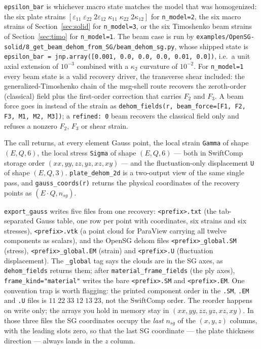 \texttt{epsilon\_bar} is whichever macro state matches the model that was
homogenized: the six plate strains
$[\varepsilon_{11}\;\varepsilon_{22}\;2\varepsilon_{12}\;\kappa_{11}\;
\kappa_{22}\;2\kappa_{12}]$ for \texttt{n\_model=2}, the six macro strains of
Section~\ref{sec:solid} for \texttt{n\_model=3}, or the six Timoshenko beam
strains of Section~\ref{sec:timo} for \texttt{n\_model=1}. The beam case is run by
\texttt{examples/OpenSG-solid/8\_get\_beam\_dehom\_from\_SG/beam\_dehom\_sg.py},
whose shipped state is
\verb|epsilon_bar = jnp.array([0.001, 0.0, 0.0, 0.0, 0.01, 0.0])|, i.e.\ a unit
axial extension of $10^{-3}$ combined with a $\kappa_2$ curvature of $10^{-2}$.
For \texttt{n\_model=1} every beam state is a valid recovery driver, the
transverse shear included: the generalized-Timoshenko chain of the msg-shell
route recovers the zeroth-order (classical) field plus the first-order
correction that carries $F_2$ and $F_3$. A beam force goes in instead of the
strain as \texttt{dehom\_fields(r, beam\_force=[F1, F2, F3, M1, M2, M3])}; a
\texttt{refined: 0} beam recovers the classical field only and refuses a
nonzero $F_2$, $F_3$ or shear strain.

The call returns, at every element Gauss point, the local strain \texttt{Gamma}
of shape $(E, Q, 6)$, the local stress \texttt{Sigma} of shape $(E, Q, 6)$ ---
both in SwiftComp storage order $(xx, yy, zz, yz, xz, xy)$ --- and the
fluctuation-only displacement \texttt{U} of shape $(E, Q, 3)$.
\texttt{plate\_dehom\_2d} is a two-output view of the same single pass, and
\texttt{gauss\_coords(r)} returns the physical coordinates of the recovery
points as $(E \cdot Q, n_{sg})$.

\texttt{export\_gauss} writes five files from one recovery:
\texttt{<prefix>.txt} (the tab-separated Gauss table, one row per point with
coordinates, six strains and six stresses), \texttt{<prefix>.vtk} (a point
cloud for ParaView carrying all twelve components as scalars), and the OpenSG
dehom files \texttt{<prefix>\_global.SM} (stress), \texttt{<prefix>\_global.EM}
(strain) and \texttt{<prefix>.U} (fluctuation displacement). The
\texttt{\_global} tag says the clouds are in the SG axes, as
\texttt{dehom\_fields} returns them; after \texttt{material\_frame\_fields} (the
ply axes), \texttt{frame\_kind="material"} writes the bare \texttt{<prefix>.SM}
and \texttt{<prefix>.EM}. One convention trap is worth
flagging: the printed component order in the \texttt{.SM}, \texttt{.EM} and
\texttt{.U} files is $11\;22\;33\;12\;13\;23$, not the SwiftComp order. The
reorder happens on write only; the arrays you hold in memory stay in
$(xx, yy, zz, yz, xz, xy)$. In those three files the SG coordinates occupy the
\emph{last} $n_{sg}$ of the $(x, y, z)$ columns, with the leading slots zero, so
that the last SG coordinate --- the plate thickness direction --- always lands
in the $z$ column.
